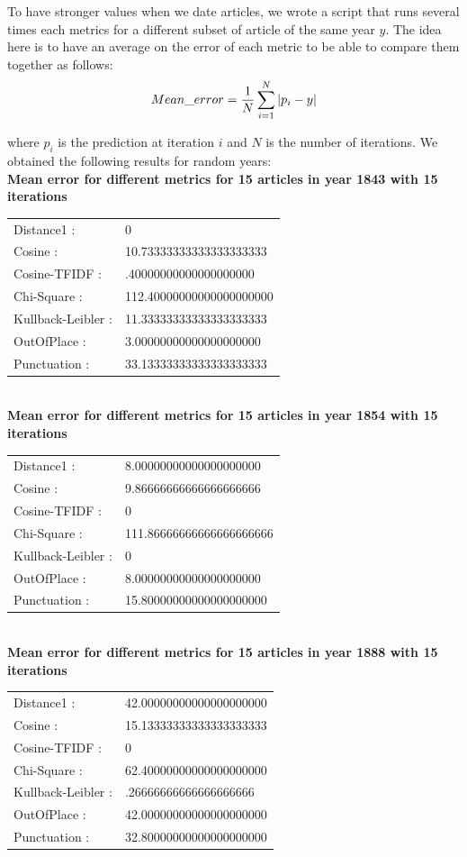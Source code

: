 To have stronger values when we date articles, we wrote a script that runs several times each metrics for a different subset of article of the same year $y$. The idea here is to have an average on the error of each metric to be able to compare them together as follows:
\[
 Mean\_ error = \frac{1}{N} \sum_{i=1}^N \arrowvert p_i - y \arrowvert
\]

where $p_i$ is the prediction at iteration $i$ and $N$ is the number of iterations. We obtained the following results for random years:\\

\textbf{Mean error for different metrics for 15 articles in year 1843 with 15 iterations}\\
\begin{tabular}{p{3cm} p{5cm}}
Distance1 :& 0\\
Cosine :& 10.73333333333333333333\\
Cosine-TFIDF :& .40000000000000000000\\
Chi-Square :& 112.40000000000000000000\\
Kullback-Leibler :& 11.33333333333333333333\\
OutOfPlace :& 3.00000000000000000000\\
Punctuation :& 33.13333333333333333333\\
\end{tabular}\\
 
\textbf{Mean error for different metrics for 15 articles in year 1854 with 15 iterations}\\
\begin{tabular}{p{3cm} p{5cm}}
    Distance1 :& 8.00000000000000000000\\
    Cosine :& 9.86666666666666666666\\
    Cosine-TFIDF :& 0\\
    Chi-Square :& 111.86666666666666666666\\
    Kullback-Leibler :& 0\\
    OutOfPlace :& 8.00000000000000000000\\
    Punctuation :& 15.80000000000000000000\\
\end{tabular}\\
 
\textbf{Mean error for different metrics for 15 articles in year 1888 with 15 iterations}\\
\begin{tabular}{p{3cm} p{5cm}}
    Distance1 :& 42.00000000000000000000\\
    Cosine :& 15.13333333333333333333\\
    Cosine-TFIDF :& 0\\
    Chi-Square :& 62.40000000000000000000\\
    Kullback-Leibler :& .26666666666666666666\\
    OutOfPlace :& 42.00000000000000000000\\
    Punctuation :& 32.80000000000000000000\\
\end{tabular}\\
 
